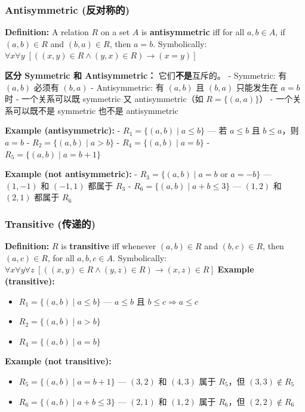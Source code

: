 \documentclass[10pt,a4paper,openany]{ctexbook}
\theoremstyle{definition}
\theoremstyle{remark}
\renewenvironment{quote}
  {\list{}{\leftmargin=1em\rightmargin=0pt\topsep=0.5pt\partopsep=0pt}\item[]}
  {\endlist}
\begin{document}
\vspace{-2pt}

\subsubsection{Antisymmetric (反对称的)}

\textbf{Definition:} A relation $R$ on a set $A$ is \textbf{antisymmetric} iff for all $a, b \in A$, if $(a,b) \in R$ and $(b,a) \in R$, then $a = b$.
Symbolically: $\forall x \forall y \; [ ((x,y) \in R \land (y,x) \in R) \longrightarrow (x = y) ]$
\begin{quote}
\textbf{区分 Symmetric 和 Antisymmetric：} 它们\textbf{不是}互斥的。
- Symmetric: 有 $(a,b)$ 必须有 $(b,a)$
- Antisymmetric: 有 $(a,b)$ 且 $(b,a)$ 只能发生在 $a=b$ 时
- 一个关系可以既 symmetric 又 antisymmetric（如 $R = \{(a,a)\}$）
- 一个关系可以既不是 symmetric 也不是 antisymmetric

\textbf{Example (antisymmetric):}
- $R_1 = \{(a,b) \mid a \le b\}$ — 若 $a \le b$ 且 $b \le a$，则 $a = b$
- $R_2 = \{(a,b) \mid a > b\}$
- $R_4 = \{(a,b) \mid a = b\}$
- $R_5 = \{(a,b) \mid a = b + 1\}$

\textbf{Example (not antisymmetric):}
- $R_3 = \{(a,b) \mid a = b \text{ or } a = -b\}$ — $(1,-1)$ 和 $(-1,1)$ 都属于 $R_3$
- $R_6 = \{(a,b) \mid a + b \le 3\}$ — $(1,2)$ 和 $(2,1)$ 都属于 $R_6$

\end{quote}
\vspace{-2pt}

\subsubsection{Transitive (传递的)}

\textbf{Definition:} $R$ is \textbf{transitive} iff whenever $(a,b) \in R$ and $(b,c) \in R$, then $(a,c) \in R$, for all $a, b, c \in A$.
Symbolically: $\forall x \forall y \forall z \; [ ((x,y) \in R \land (y,z) \in R) \longrightarrow (x,z) \in R ]$
\textbf{Example (transitive):}
\begin{itemize}
\item $R_1 = \{(a,b) \mid a \le b\}$ — $a \le b$ 且 $b \le c \Rightarrow a \le c$
\item $R_2 = \{(a,b) \mid a > b\}$
\item $R_4 = \{(a,b) \mid a = b\}$

\end{itemize}

\textbf{Example (not transitive):}
\begin{itemize}
\item $R_5 = \{(a,b) \mid a = b + 1\}$ — $(3,2)$ 和 $(4,3)$ 属于 $R_5$，但 $(3,3) \notin R_5$
\item $R_6 = \{(a,b) \mid a + b \le 3\}$ — $(2,1)$ 和 $(1,2)$ 属于 $R_6$，但 $(2,2) \notin R_6$

\end{itemize}
\end{document}
